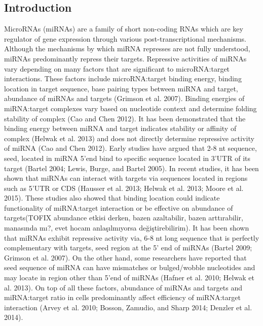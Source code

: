 \documentclass[]{article}
\begin{document}
\hypertarget{introduction}{%
\subsection{Introduction}\label{introduction}}

MicroRNAs (miRNAs) are a family of short non-coding RNAs which are key
regulator of gene expression through various post-transcriptional
mechanisms. Although the mechanisms by which miRNA represses are not
fully understood, miRNAs predominantly repress their targets. Repressive
activities of miRNAs vary depending on many factors that are significant
to microRNA:target interactions. These factors include microRNA:target
binding energy, binding location in target sequence, base pairing types
between miRNA and target, abundance of miRNAs and targets (Grimson et
al. 2007). Binding energies of miRNA:target complexes vary based on
nucleotide context and determine folding stability of complex (Cao and
Chen 2012). It has been demonstrated that the binding energy between
miRNA and target indicates stability or affinity of complex (Helwak et
al. 2013) and does not directly determine repressive activity of miRNA
(Cao and Chen 2012). Early studies have argued that 2-8 nt sequence,
seed, located in miRNA 5'end bind to specific sequence located in 3'UTR
of its target (Bartel 2004; Lewis, Burge, and Bartel 2005). In recent
studies, it has been shown that miRNAs can interact with targets via
sequences located in regions such as 5'UTR or CDS (Hausser et al. 2013;
Helwak et al. 2013; Moore et al. 2015). These studies also showed that
binding location could indicate functionality of miRNA:target
interaction or be effective on abundance of targets(TOFIX abundance
etkisi derken, bazen azaltabilir, bazen arttırabilir, manasında mı?,
evet hocam anlaşılmıyorsa değiştirebilirim). It has been shown that
miRNAs exhibit repressive activity via, 6-8 nt long sequence that is
perfectly complementary with targets, seed region at the 5' end of
miRNAs (Bartel 2009; Grimson et al. 2007). On the other hand, some
researchers have reported that seed sequence of miRNA can have
mismatches or bulged/wobble nucleotides and may locate in region other
than 5'end of miRNAs (Hafner et al. 2010; Helwak et al. 2013). On top of
all these factors, abundance of miRNAs and targets and miRNA:target
ratio in cells predominantly affect efficiency of miRNA:target
interaction (Arvey et al. 2010; Bosson, Zamudio, and Sharp 2014; Denzler
et al. 2014).
\end{document}

